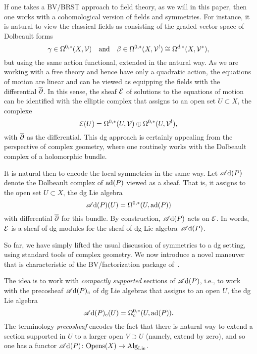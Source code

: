 If one takes a BV/BRST approach to field theory, as we will in this paper,
then one works with a cohomological version of fields and symmetries.
For instance, it is natural to view the classical fields as consisting of the graded vector space of Dolbeault forms
\[
\gamma \in \Omega^{0,*}(X,\mathcal{V}) \quad \text{and} \quad \beta \in \Omega^{0,*}(X, \mathcal{V}^!) \cong \Omega^{d,*}(X, \mathcal{V}^*),
\]
but using the same action functional, extended in the natural way.
As we are working with a free theory and hence have only a quadratic action,
the equations of motion are linear and can be viewed as equipping the fields with the differential $\overline{\partial}$.
In this sense, the sheaf $\mathcal E$ of solutions to the equations of motion can be identified with the elliptic complex that assigns to an open set $U \subset X$, the complexe
\[
\mathcal E(U) = \Omega^{0,*}(U,\mathcal{V}) \oplus \Omega^{0,*}(U, \mathcal{V}^!),
\]
with $\overline{\partial}$ as the differential.
This dg approach is certainly appealing from the perspective of complex geometry,
where one routinely works with the Dolbeault complex of a holomorphic bundle.

It is natural then to encode the local symmetries in the same way.
Let $\mathscr A{\rm d}(P)$ denote the Dolbeault complex of ${\rm ad}(P)$ viewed as a sheaf.
That is, it assigns to the open set $U \subset X$, the dg Lie algebra 
\[
\mathscr A{\rm d}(P)(U) = \Omega^{0,*}(U,{\rm ad}(P))
\]
with differential $\overline{\partial}$ for this bundle.
By construction, $\mathscr A{\rm d}(P)$ acts on $\mathcal E$.
In words, $\mathcal E$ is a sheaf of dg modules for the sheaf of dg Lie algebra~$\mathscr A{\rm d}(P)$.

So far, we have simply lifted the usual discussion of symmetries to a dg setting,
using standard tools of complex geometry.
We now introduce a novel maneuver that is characteristic of the BV/factorization package of~\cite{CG1,CG2}.

The idea is to work with {\em compactly supported} sections of $\mathscr A{\rm d}(P)$, 
i.e., to work with the precosheaf $\mathscr A{\rm d}(P)_c$ of dg Lie algebras that assigns to an open $U$,
the dg Lie algebra
\[
\mathscr A{\rm d}(P)_c(U) = \Omega^{0,*}_c(U,{\rm ad}(P)).
\]
The terminology {\em precosheaf} encodes the fact that there is natural way to extend a section supported in $U$ to a larger open $V \supset U$ (namely, extend by zero),
and so one has a functor $\mathscr A{\rm d}(P) \colon {\rm Opens}(X) \to {\rm Alg}_{\rm Lie}$.

